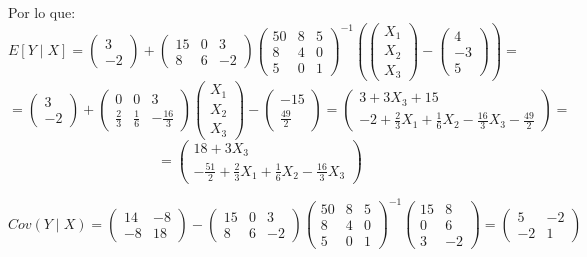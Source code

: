 \documentclass[11pt,a4paper]{article}
\begin{document}
\begin{enumerate}[label=\arabic*.]
Por lo que:
$$E[Y \mid X] = \begin{pmatrix}
3 \\
-2
\end{pmatrix} + \begin{pmatrix}
15 & 0 & 3 \\
8 & 6 & -2
\end{pmatrix} \begin{pmatrix}
50 & 8 & 5 \\
8 & 4 & 0 \\
5 & 0 & 1
\end{pmatrix}^{-1}(\begin{pmatrix}
X_{1} \\
X_{2} \\
X_{3}
\end{pmatrix} - \begin{pmatrix}
4 \\
-3 \\
5
\end{pmatrix}) =$$
$$= \begin{pmatrix}
3 \\
-2
\end{pmatrix} + \begin{pmatrix}
0 & 0 & 3 \\
\frac{2}{3} & \frac{1}{6} & -\frac{16}{3}
\end{pmatrix}\begin{pmatrix}
X_{1} \\
X_{2} \\
X_{3}
\end{pmatrix} - \begin{pmatrix}
-15 \\
\frac{49}{2}
\end{pmatrix} = \begin{pmatrix}
3 + 3X_{3} + 15 \\
-2 + \frac{2}{3}X_{1} + \frac{1}{6}X_{2} - \frac{16}{3}X_{3} - \frac{49}{2}
\end{pmatrix} =$$
$$= \begin{pmatrix}
18 + 3X_{3} \\
-\frac{51}{2} + \frac{2}{3}X_{1} + \frac{1}{6}X_{2} - \frac{16}{3}X_{3}
\end{pmatrix}$$

$$Cov(Y \mid X) = \begin{pmatrix}
14 & -8 \\
-8 & 18
\end{pmatrix} - \begin{pmatrix}
15 & 0 & 3 \\
8 & 6 & -2
\end{pmatrix} \begin{pmatrix}
50 & 8 & 5 \\
8 & 4 & 0 \\
5 & 0 & 1
\end{pmatrix}^{-1} \begin{pmatrix}
15 & 8 \\
0 & 6 \\
3 & -2
\end{pmatrix} = \begin{pmatrix}
5 & -2 \\
-2 & 1
\end{pmatrix}$$


\end{enumerate}
\end{document}
